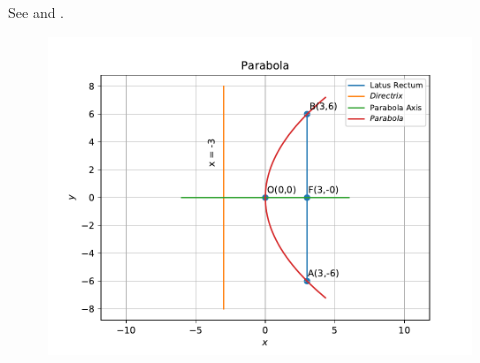 See 
and 
.
\begin{figure}[!h]
	\begin{center}
		\includegraphics[width=\columnwidth]{chapters/11/11/2/1/figs/problem1.pdf}
	\end{center}
\caption{}
\label{fig:11/11/2/1Fig1}
\end{figure}
